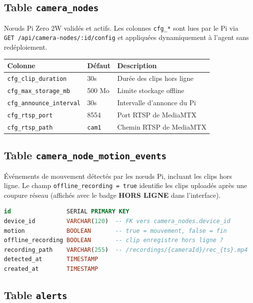 \documentclass[12pt,a4paper]{article}
\begin{document}
\subsection{Table \texttt{camera\_nodes}}

Nœuds Pi Zero 2W validés et actifs. Les colonnes \texttt{cfg\_*} sont lues par le Pi
via \texttt{GET /api/camera-nodes/:id/config} et appliquées dynamiquement à l'agent
sans redéploiement.

\begin{longtable}{|l|l|p{7cm}|}
\hline
\textbf{Colonne} & \textbf{Défaut} & \textbf{Description} \\
\hline
\endhead
\hline
\endfoot
\texttt{cfg\_clip\_duration} & 30s & Durée des clips hors ligne \\
\texttt{cfg\_max\_storage\_mb} & 500 Mo & Limite stockage offline \\
\texttt{cfg\_announce\_interval} & 30s & Intervalle d'annonce du Pi \\
\texttt{cfg\_rtsp\_port} & 8554 & Port RTSP de MediaMTX \\
\texttt{cfg\_rtsp\_path} & \texttt{cam1} & Chemin RTSP de MediaMTX \\
\hline
\end{longtable}

\subsection{Table \texttt{camera\_node\_motion\_events}}

Événements de mouvement détectés par les nœuds Pi, incluant les clips hors ligne.
Le champ \texttt{offline\_recording = true} identifie les clips uploadés après une
coupure réseau (affichés avec le badge \textbf{HORS LIGNE} dans l'interface).

\begin{lstlisting}[language=sql]
id                SERIAL PRIMARY KEY
device_id         VARCHAR(120)  -- FK vers camera_nodes.device_id
motion            BOOLEAN       -- true = mouvement, false = fin
offline_recording BOOLEAN       -- clip enregistre hors ligne ?
recording_path    VARCHAR(255)  -- /recordings/{cameraId}/rec_{ts}.mp4
detected_at       TIMESTAMP
created_at        TIMESTAMP
\end{lstlisting}

\subsection{Table \texttt{alerts}}
\end{document}

